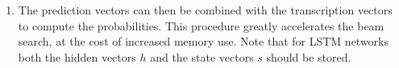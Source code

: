 \begin{enumerate}
    \item The prediction vectors can then be combined with the transcription vectors to compute the probabilities. 
    This procedure greatly accelerates the beam search, at the cost of increased memory use. 
    Note that for LSTM networks both the hidden vectors $h$ and the state vectors $s$ should be stored.
    \hfill \cite{arxiv/1211.3711/Sequence-Transduction-RNN}
\end{enumerate}












